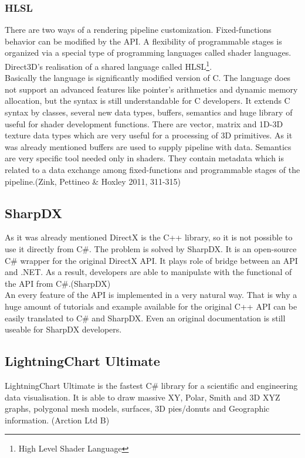 \documentclass[twoside, english, 11pt]{report}
\begin{document}
\subsubsection{HLSL}
There are two ways of a rendering pipeline customization. Fixed-functions behavior can be modified by the API. A flexibility of programmable stages is organized via a special type of programming languages called shader languages. Direct3D's realisation of a shared language called HLSL\footnote{High Level Shader Language}.\\

Basically the language is significantly modified version of C. The language does not support an advanced features like pointer's arithmetics and dynamic memory allocation, but the syntax is still understandable for C developers. It extends C syntax by classes, several new data types, buffers, semantics and huge library of useful for shader development functions. There are vector, matrix and 1D-3D texture data types which are very useful for a processing of 3D primitives. As it was already mentioned buffers are used to supply pipeline with data. Semantics are very specific tool needed only in shaders. They contain metadata which is related to a data exchange among fixed-functions and programmable stages of the pipeline.(Zink, Pettineo \& Hoxley 2011, 311-315)
\subsection{SharpDX}

As it was already mentioned DirectX is the C++ library, so it is not possible to use it directly from C\#. The problem is solved by SharpDX. It is an open-source C\# wrapper for the original DirectX API. It plays role of bridge between an API and .NET. As a result, developers are able to manipulate with the functional of the API from C\#.(SharpDX)\\

An every feature of the API is implemented in a very natural way. That is why a huge amount of tutorials and example available for the original C++ API can be easily translated to C\# and SharpDX. Even an original documentation is still useable for SharpDX developers.

\subsection{LightningChart Ultimate}

LightningChart Ultimate is the fastest C\# library for a scientific and engineering data visualisation. It is able to draw massive XY, Polar, Smith and 3D XYZ graphs, polygonal mesh models, surfaces, 3D pies/donuts and Geographic information. (Arction Ltd B)
\end{document}
